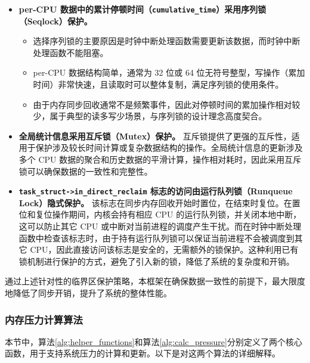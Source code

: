 \begin{itemize}
    \item \textbf{per-CPU 数据中的累计停顿时间（\texttt{cumulative\_time}）采用序列锁（Seqlock）保护。}
    \begin{itemize}
        \item 选择序列锁的主要原因是时钟中断处理函数需要更新该数据，而时钟中断处理函数不能阻塞。
        \item per-CPU 数据结构简单，通常为 32 位或 64 位无符号整型，写操作（累加时间）非常快速，且读取时可以整体复制，满足序列锁的使用条件。
        \item 由于内存同步回收通常不是频繁事件，因此对停顿时间的累加操作相对较少，属于典型的读多写少场景，与序列锁的设计理念高度契合。
    \end{itemize}

    \item \textbf{全局统计信息采用互斥锁（Mutex）保护。} 互斥锁提供了更强的互斥性，适用于保护涉及较长时间计算或复杂数据结构的操作。全局统计信息的更新涉及多个 CPU 数据的聚合和历史数据的平滑计算，操作相对耗时，因此采用互斥锁可以确保数据的一致性和完整性。

    \item \textbf{\texttt{task\_struct->in\_direct\_reclaim} 标志的访问由运行队列锁（Runqueue Lock）隐式保护。}
    该标志在同步内存回收开始时置位，在结束时复位。在置位和复位操作期间，内核会持有相应 CPU 的运行队列锁，并关闭本地中断，这可以防止其它 CPU 或中断对当前进程的调度产生干扰。而在时钟中断处理函数中检查该标志时，由于持有运行队列锁可以保证当前进程不会被调度到其它 CPU，因此直接访问该标志是安全的，无需额外的锁保护。这种利用已有锁机制进行保护的方式，避免了引入新的锁，降低了系统的复杂度和开销。
\end{itemize}

通过上述针对性的临界区保护策略，本框架在确保数据一致性的前提下，最大限度地降低了同步开销，提升了系统的整体性能。


\subsubsection{内存压力计算算法}

本节中，算法\ref{alg:helper_functions}和算法\ref{alg:calc_pressure}分别定义了两个核心函数，用于支持系统压力的计算和更新。以下是对这两个算法的详细解释。

